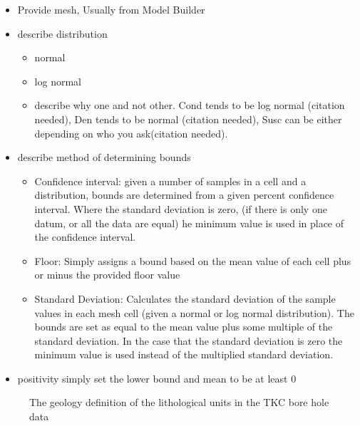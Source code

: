 \begin{itemize}
 \item Provide mesh, Usually from Model Builder
 \item describe distribution 
 \begin{itemize}
  \item normal
  \item log normal
  \item describe why one and not other. Cond tends to be log normal (citation needed), Den tends to be normal (citation needed), Susc can be either depending on who you ask(citation needed).
 \end{itemize}
 \item describe method of determining bounds
 \begin{itemize}
  \item Confidence interval: given a number of samples in a cell and a distribution, bounds are determined from a given percent confidence interval. Where the standard deviation is zero, (if there is only one datum, or all the data are equal) he minimum value is used in place of the confidence interval.
  \item Floor: Simply assigns a bound based on the mean value of each cell plus or minus the provided floor value
  \item Standard Deviation: Calculates the standard deviation of the sample values in each mesh cell (given a normal or log normal distribution). The bounds are set as equal to the mean value plus some multiple of the standard deviation. In the case that the standard deviation is zero the minimum value is used instead of the multiplied standard deviation. 
 \end{itemize}
 \item positivity simply set the lower bound and mean to be at least 0
\end{itemize}

 \begin{figure} [h]
    \centering
    \caption{The geology definition of the lithological units in the TKC bore hole data}
    \label{fig:disc}
\end{figure}

